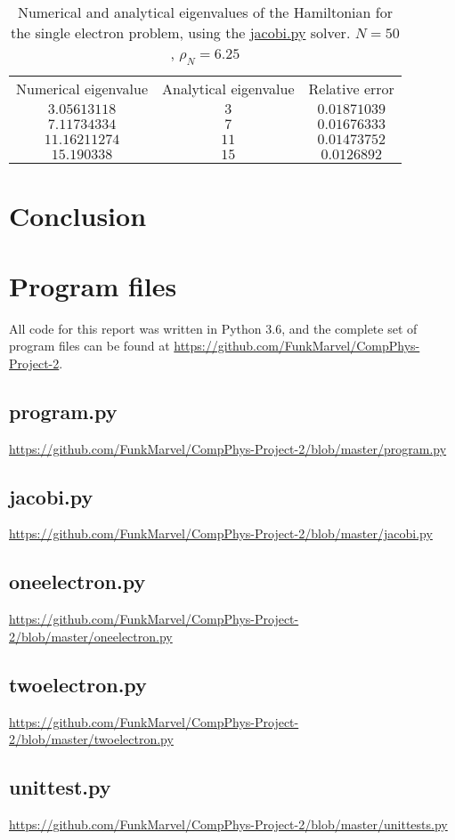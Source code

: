 \documentclass[english,notitlepage,reprint]{revtex4-1}  %
\begin{document}
\begin{table}[H]
	\label{tab:434}
	\centering
	\begin{tabular}{|c|c|c|}
	Numerical eigenvalue & Analytical eigenvalue & Relative error \\
	\(3.05613118\)	& \(3\) & \(0.01871039\) \\
	\(7.11734334\) & \(7\) & \(0.01676333\) \\
	\(11.16211274\) & \(11\) & \(0.01473752\) \\
	\(15.190338\) & \(15\) & \(0.0126892\) \\
	\end{tabular}
	\caption{Numerical and analytical eigenvalues of the Hamiltonian for
	the single electron problem, using the \hyperref[A:2]{jacobi.py} solver. \(N=50\),
	\(\rho_{N}=6.25\)}
\end{table}


\section{Conclusion}\label{sec:5}

{}
\newpage
\appendix
\section{Program files} \label{A}
All code for this report was written in Python 3.6, and the complete set of program files can be found at \url{https://github.com/FunkMarvel/CompPhys-Project-2}.

\subsection{program.py}\label{A:1}
\url{https://github.com/FunkMarvel/CompPhys-Project-2/blob/master/program.py}

\subsection{jacobi.py}\label{A:2}
\url{https://github.com/FunkMarvel/CompPhys-Project-2/blob/master/jacobi.py}

\subsection{oneelectron.py} \label{A:3}
\url{https://github.com/FunkMarvel/CompPhys-Project-2/blob/master/oneelectron.py}

\subsection{twoelectron.py} \label{A:4}
\url{https://github.com/FunkMarvel/CompPhys-Project-2/blob/master/twoelectron.py}

\subsection{unittest.py}\label{A:5}
\url{https://github.com/FunkMarvel/CompPhys-Project-2/blob/master/unittests.py}
\end{document}
